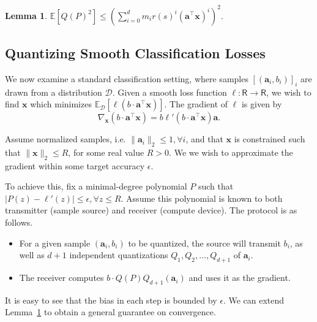 \documentclass{article}
\newcommand{\R}{\mathsf{R}}
\renewcommand{\vec}[1]{\mathbf{#1}}
\def\E{\mathbb{E}}
\newtheorem{lemma}{Lemma}
\begin{document}
\begin{lemma}
\label{lem:poly-sec-moment-bound}
	$\E[ Q(P)^2 ] \leq \left(\sum_{i = 0}^d m_i r(s)^i (\vec{a}^\top \vec{x})^i\right)^2.$
\end{lemma} 



\vspace{-0.5em}
\subsection{Quantizing Smooth Classification Losses}
\vspace{-0.5em}

We now examine a standard classification setting, where samples $[(\vec{a}_i, b_i)]_i$ are drawn from a distribution $\mathcal{D}$. Given a smooth loss function $\ell: \R \rightarrow \R$,  we wish to find $\vec{x}$ which minimizes $\E_{\mathcal{D}} [ \ell( b \cdot \vec{a}^\top \vec{x}) ]$. The gradient of $\ell$ is given by 
$$ \nabla_\vec{x} (b \cdot \vec{a}^\top \vec{x}) = b \ell' (b \cdot \vec{a}^\top \vec{x}) \vec{a}.$$

Assume normalized samples, i.e. $\| \vec{a}_i \|_2 \leq 1, \forall i$, and that $\vec{x}$ is constrained such that $\| \vec{x} \|_2 \leq R$, for some real value $R > 0$. We we wish to approximate the gradient within some target accuracy $\epsilon$. 

To achieve this, fix a minimal-degree polynomial $P$ such that $|P(z) - \ell'(z)| \leq \epsilon, \forall z \leq R$. Assume this polynomial is known to both transmitter (sample source) and receiver (compute device). The protocol is as follows. 
\vspace{-0.5em}
\begin{itemize}
    \vspace{-0.5em}
	\item For a given sample $(\vec{a}_i, b_i)$ to be quantized, the source will transmit $b_i$, as well as $d + 1$ independent quantizations $Q_1, Q_2, \ldots, Q_{d + 1}$ of $\vec{a}_i$. 
    \vspace{-0.5em}
	\item The receiver computes $b \cdot Q(P) Q_{d + 1} ( \vec{a}_i )$ and uses it as the gradient.
\end{itemize}

\vspace{-0.5em}
It is easy to see that the bias in each step is bounded by $\epsilon$. 
We can extend Lemma~\ref{lem:poly-sec-moment-bound} to obtain a general guarantee on convergence. 
\end{document}
